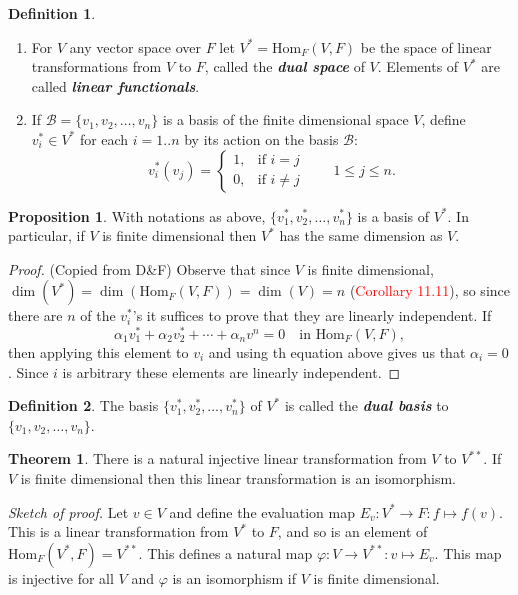 \documentclass[10pt]{article}
\theoremstyle{definition}
\newtheorem{thm}{Theorem}[section]
\newtheorem*{prop}{Proposition}
\newtheorem*{defn}{Definition}
\newcommand{\nl}{\vspace{7em}}
\newcommand{\ra}{\rightarrow}
\newcommand{\al}{\alpha}
\newcommand{\vphi}{\varphi}
\newcommand{\Hom}{\text{Hom}}
\newcommand{\BB}{\mathcal{B}}
\begin{document}
\nl

\begin{defn}\nl
\begin{enumerate}
\item For $V$ any vector space over $F$ let $V^* = \Hom_F(V,F)$ be the space of linear transformations from $V$ to $F$, called the \textit{\textbf{dual space}} of $V$. Elements of $V^*$ are called \textit{\textbf{linear functionals}}.
\item If $\BB  = \{v_1,v_2,\ldots,v_n\}$ is a basis of the finite dimensional space $V$, define $v_i^* \in V^*$ for each $i = 1..n$ by its action on the basis $\BB$:
\[v_i^*(v_j) = \begin{cases}1, & \text{if } i = j\\
0, & \text{if } i \neq j\end{cases}\qquad 1\leq j\leq n.\]
\end{enumerate}
\end{defn}

\nl

\begin{prop}
With notations as above, $\{v_1^*,v_2^*,\ldots,v_n^*\}$ is a basis of $V^*$. In particular, if $V$ is finite dimensional then $V^*$ has the same dimension as $V$.

\begin{proof}
(Copied from D\&F) Observe that since $V$ is finite dimensional, $\dim(V^*) = \dim(\Hom_F(V,F)) = \dim(V) = n$ (\textcolor{red}{Corollary 11.11}), so since there are $n$ of the $v_i^*$'s it suffices to prove that they are linearly independent. If
\[\al_1v_1^* + \al_2v_2^* + \cdots + \al_nv^n = 0\quad \text{in } \Hom_F(V,F),\]
then applying this element to $v_i$ and using th equation above gives us that $\al_i = 0$. Since $i$ is arbitrary these elements are linearly independent.
\end{proof}
\end{prop}

\nl

\begin{defn}
The basis $\{v_1^*,v_2^*,\ldots,v_n^*\}$ of $V^*$ is called the \textit{\textbf{dual basis}} to  $\{v_1,v_2,\ldots,v_n\}$.
\end{defn}

\nl

\begin{thm}
There is a natural injective linear transformation from $V$ to $V^{**}$. If $V$ is finite dimensional then this linear transformation is an isomorphism. 

\textit{Sketch of proof.} Let $v\in V$ and define the evaluation map $E_v:V^*\ra F:f\mapsto f(v)$. This is a linear transformation from $V^*$ to $F$, and so is an element of $\Hom_F(V^*, F) = V^{**}$. This defines a natural map $\vphi: V\ra V^{**}:v\mapsto E_v$. This map is injective for all $V$ and $\vphi$ is an isomorphism if $V$ is finite dimensional.
\end{thm}
\end{document}
